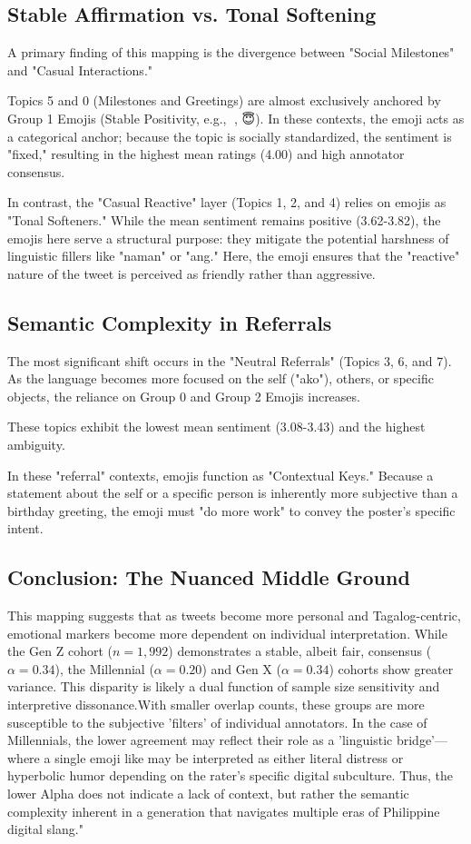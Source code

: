 \subsection{Stable Affirmation vs. Tonal Softening}
A primary finding of this mapping is the divergence between "Social Milestones" and "Casual Interactions."

Topics 5 and 0 (Milestones and Greetings) are almost exclusively anchored by Group 1 Emojis (Stable Positivity, e.g., 🥳, 😇). In these contexts, the emoji acts as a categorical anchor; because the topic is socially standardized, the sentiment is "fixed," resulting in the highest mean ratings (4.00) and high annotator consensus.

In contrast, the "Casual Reactive" layer (Topics 1, 2, and 4) relies on emojis as "Tonal Softeners." While the mean sentiment remains positive (3.62-3.82), the emojis here serve a structural purpose: they mitigate the potential harshness of linguistic fillers like "naman" or "ang." Here, the emoji ensures that the "reactive" nature of the tweet is perceived as friendly rather than aggressive.

\subsection{Semantic Complexity in Referrals}
The most significant shift occurs in the "Neutral Referrals" (Topics 3, 6, and 7). As the language becomes more focused on the self ("ako"), others, or specific objects, the reliance on Group 0 and Group 2 Emojis increases.

These topics exhibit the lowest mean sentiment (3.08-3.43) and the highest ambiguity.

In these "referral" contexts, emojis function as "Contextual Keys." Because a statement about the self or a specific person is inherently more subjective than a birthday greeting, the emoji must "do more work" to convey the poster's specific intent.

\subsection{Conclusion: The Nuanced Middle Ground}
This mapping suggests that as tweets become more personal and Tagalog-centric, emotional markers become more dependent on individual interpretation. While the Gen Z cohort ($n=1,992$) demonstrates a stable, albeit fair, consensus ($\alpha=0.34$), the Millennial ($\alpha=0.20$) and Gen X ($\alpha=0.34$) cohorts show greater variance. This disparity is likely a dual function of sample size sensitivity and interpretive dissonance.With smaller overlap counts, these groups are more susceptible to the subjective 'filters' of individual annotators. In the case of Millennials, the lower agreement may reflect their role as a 'linguistic bridge'—where a single emoji like  may be interpreted as either literal distress or hyperbolic humor depending on the rater's specific digital subculture. Thus, the lower Alpha does not indicate a lack of context, but rather the semantic complexity inherent in a generation that navigates multiple eras of Philippine digital slang."


